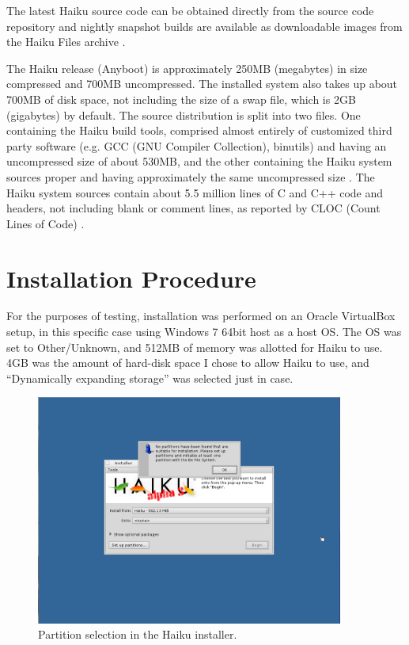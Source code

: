 \documentclass{article}
\begin{document}
The latest Haiku source code can be obtained directly from the source
code repository \cite{HaikuGetSvn} and nightly snapshot builds are
available as downloadable images from the Haiku Files archive
\cite{HaikuFiles}.

The Haiku release (Anyboot) is approximately 250MB (megabytes) in size
compressed \cite{HaikuGet} and 700MB uncompressed.  The installed
system also takes up about 700MB of disk space, not including the size
of a swap file, which is 2GB (gigabytes) by default.  The source
distribution is split into two files.  One containing the Haiku build
tools, comprised almost entirely of customized third party software
(e.g. GCC (GNU Compiler Collection), binutils) and having an
uncompressed size of about 530MB, and the other containing the Haiku
system sources proper and having approximately the same uncompressed
size \cite{HaikuR1A3Src}.  The Haiku system sources contain about 5.5
million lines of C and C++ code and headers, not including blank or
comment lines, as reported by CLOC (Count Lines of Code) \cite{Cloc}.

\section{Installation Procedure}

For the purposes of testing, installation was performed on an Oracle
VirtualBox setup, in this specific case using Windows 7 64bit host as
a host OS.  The OS was set to Other/Unknown, and 512MB of memory was
allotted for Haiku to use. 4GB was the amount of hard-disk space I
chose to allow Haiku to use, and ``Dynamically expanding storage'' was
selected just in case.

\begin{figure}[h]
\centering
\includegraphics[width=0.9\textwidth]{figs/install-partition.png}
\caption{Partition selection in the Haiku installer.}
\label{fig:install-partition}
\end{figure}
\end{document}
